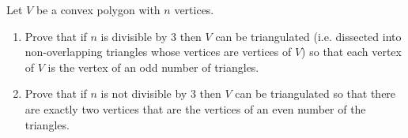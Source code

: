 \documentclass{article}
\begin{document}
\setlength{\parindent}{0pt}
Let $V$ be a convex polygon with $n$ vertices.
\begin{enumerate}[label=(\alph*)]
\item Prove that if $n$ is divisible by $3$ then $V$ can be triangulated (i.e. dissected into non-overlapping triangles whose vertices are vertices of $V$) so that each vertex of $V$ is the vertex of an odd number of triangles.
\item Prove that if $n$ is not divisible by $3$ then $V$ can be triangulated so that there are exactly two vertices that are the vertices of an even number of the triangles.
\end{enumerate}
\end{document}
